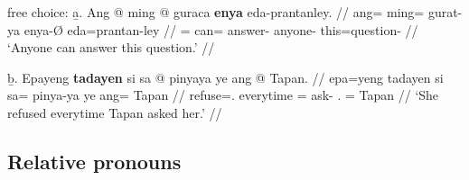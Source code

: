 \a free choice:\vspace{.5em} %
	\beginsubsub
	\b{a.} \begingl
		\gla Ang @ ming @ guraca \textbf{enya} eda-prantanley. //
		\glb ang= ming= gurat-ya enya-Ø eda=prantan-ley //
		\glc \AgtT{}= can= answer-\TsgM{} anyone-\Top{} 
				this=question-\PargI{} //
		\glft `Anyone can answer this question.' //
		\endgl\vspace{.5em}
		
	\b{b.} \begingl
		\gla Epayeng \textbf{tadayen} si sa @ pinyaya ye ang @ Tapan. //
		\glb epa=yeng tadayen si sa= pinya-ya ye ang= Tapan //
		\glc refuse=\TsgF{}.\Aarg{} everytime \Rel{} \PatT{}=
				ask-\TsgM{} \TsgF{}.\Top{} \Aarg{}= Tapan //
		\glft `She refused everytime Tapan asked her.' //
		\endgl
	\endsubsub
	
\xe


\subsection{Relative pronouns}
\label{subsec:relpro}

